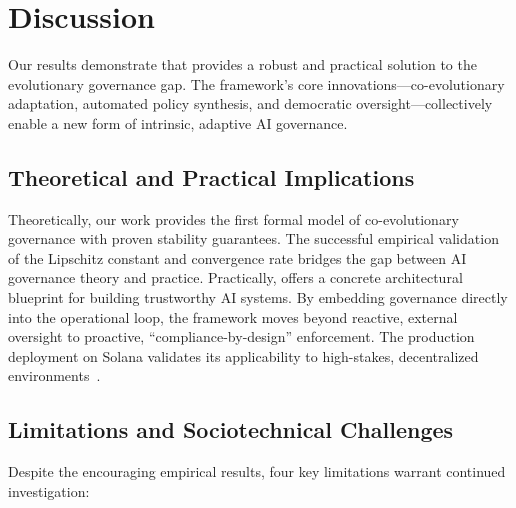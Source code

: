 \section{Discussion}\label{sec:discussion}
Our results demonstrate that \acgs{} provides a robust and practical solution to the evolutionary governance gap. The framework's core innovations---co-evolutionary adaptation, automated policy synthesis, and democratic oversight---collectively enable a new form of intrinsic, adaptive AI governance.

\subsection{Theoretical and Practical Implications}
Theoretically, our work provides the first formal model of co-evolutionary governance with proven stability guarantees. The successful empirical validation of the Lipschitz constant and convergence rate bridges the gap between AI governance theory and practice. Practically, \acgs{} offers a concrete architectural blueprint for building trustworthy AI systems. By embedding governance directly into the operational loop, the framework moves beyond reactive, external oversight to proactive, ``compliance-by-design'' enforcement. The production deployment on Solana validates its applicability to high-stakes, decentralized environments~\cite{solana2020, quantumagi2024}.

\subsection{Limitations and Sociotechnical Challenges}
Despite the encouraging empirical results, four key limitations warrant continued investigation:

